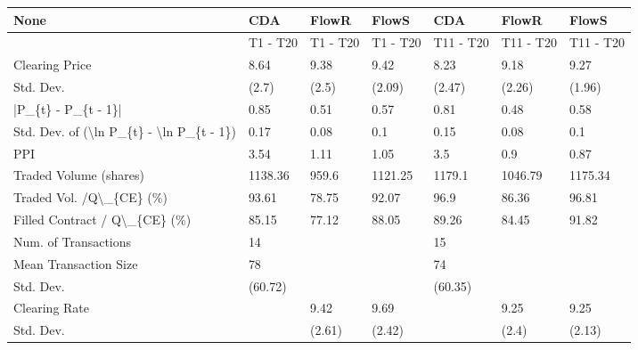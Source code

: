 \begin{tabular}{lllllll}
\hline
 None                                                      & CDA      & FlowR    & FlowS    & CDA       & FlowR     & FlowS     \\
\hline
                                                           & T1 - T20 & T1 - T20 & T1 - T20 & T11 - T20 & T11 - T20 & T11 - T20 \\
 Clearing Price                                            & 8.64     & 9.38     & 9.42     & 8.23      & 9.18      & 9.27      \\
 Std. Dev.                                                 & (2.7)    & (2.5)    & (2.09)   & (2.47)    & (2.26)    & (1.96)    \\
 |P\_\{t\} - P\_\{t - 1\}|                                       & 0.85     & 0.51     & 0.57     & 0.81      & 0.48      & 0.58      \\
 Std. Dev. of (\textbackslash{}ln P\_\{t\} - \textbackslash{}ln P\_\{t - 1\})                  & 0.17     & 0.08     & 0.1      & 0.15      & 0.08      & 0.1       \\
 PPI                                                       & 3.54     & 1.11     & 1.05     & 3.5       & 0.9       & 0.87      \\
 Traded Volume (shares)                                    & 1138.36  & 959.6    & 1121.25  & 1179.1    & 1046.79   & 1175.34   \\
 Traded Vol. /Q\textbackslash{}\_\{CE\} (\%)                                  & 93.61    & 78.75    & 92.07    & 96.9      & 86.36     & 96.81     \\
 Filled Contract / Q\textbackslash{}\_\{CE\} (\%)                             & 85.15    & 77.12    & 88.05    & 89.26     & 84.45     & 91.82     \\
 Num. of Transactions                                      & 14       &          &          & 15        &           &           \\
 Mean Transaction Size                                     & 78       &          &          & 74        &           &           \\
 Std. Dev.                                                 & (60.72)  &          &          & (60.35)   &           &           \\
 Clearing Rate                                             &          & 9.42     & 9.69     &           & 9.25      & 9.25      \\
 Std. Dev.                                                 &          & (2.61)   & (2.42)   &           & (2.4)     & (2.13)    \\

\end{tabular}
